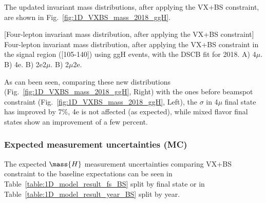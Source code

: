 The updated invariant mass distributions, after applying the VX+BS constraint, are shown in Fig.~\ref{fig:1D_VXBS_mass_2018_ggH}.
\begin{multiFigure}[!htbp]
    \centering
            [Four-lepton invariant mass distribution, after applying the VX+BS constraint]
            {Four-lepton invariant mass distribution, after applying the VX+BS constraint in the signal region ([105-140]\GeV) using ggH events, with the DSCB fit for 2018.
            \;A) 4$\mu$.    %
            \;B) 4e.
            \;B) 2e2$\mu$.
            \;B) 2$\mu$2e.
            }
    \label{fig:1D_VXBS_mass_2018_ggH}
    \end{multiFigure}
As can been seen, comparing these new distributions (Fig.~\ref{fig:1D_VXBS_mass_2018_ggH}, Right) with the ones before beamspot constraint (Fig.~\ref{fig:1D_VXBS_mass_2018_ggH}, Left), the $\sigma$ in 4$\mu$ final state has improved by 7$\%$, 4e is not affected (as expected), while mixed flavor final states show an improvement of a few percent.

\subsubsection{Expected \mH measurement uncertainties (MC)}
The expected $\mass{H}$ measurement uncertainties comparing VX+BS constraint to the baseline expectations can be seen in Table~\ref{table:1D_model_result_fs_BS} split by final state or in Table~\ref{table:1D_model_result_year_BS} split by year.

